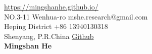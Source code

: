 \documentclass{cv} %
\begin{document}
 \hfill \href{https://mingshanhe.github.io/}{https://mingshanhe.github.io/}\\
NO.3-11 Wenhua-ro \hfill mshe.research@gmail.com\\
Heping District \hfill +86 13940130318\\
Shenyang, P.R.China \hfill \href{https://github.com/MingshanHe}{Github}\\

\hfil{\namesize\bf Mingshan He}\hfil











%


\end{document}
